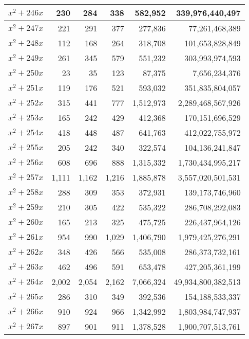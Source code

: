 \documentclass[a4paper]{amsproc}
\theoremstyle{plain}
\begin{document}
\begin{longtable}{ | l | r | r | r | r | r | }
$x^2 + 246x$ & 230 & 284 & 338 & 582{,}952 & 339{,}976{,}440{,}497 \\ \hline
$x^2 + 247x$ & 221 & 291 & 377 & 277{,}836 & 77{,}261{,}468{,}389 \\ \hline
$x^2 + 248x$ & 112 & 168 & 264 & 318{,}708 & 101{,}653{,}828{,}849 \\ \hline
$x^2 + 249x$ & 261 & 345 & 579 & 551{,}232 & 303{,}993{,}974{,}593 \\ \hline
$x^2 + 250x$ & 23 & 35 & 123 & 87{,}375 & 7{,}656{,}234{,}376 \\ \hline
$x^2 + 251x$ & 119 & 176 & 521 & 593{,}032 & 351{,}835{,}804{,}057 \\ \hline
$x^2 + 252x$ & 315 & 441 & 777 & 1{,}512{,}973 & 2{,}289{,}468{,}567{,}926 \\ \hline
$x^2 + 253x$ & 165 & 242 & 429 & 412{,}368 & 170{,}151{,}696{,}529 \\ \hline
$x^2 + 254x$ & 418 & 448 & 487 & 641{,}763 & 412{,}022{,}755{,}972 \\ \hline
$x^2 + 255x$ & 205 & 242 & 340 & 322{,}574 & 104{,}136{,}241{,}847 \\ \hline
$x^2 + 256x$ & 608 & 696 & 888 & 1{,}315{,}332 & 1{,}730{,}434{,}995{,}217 \\ \hline
$x^2 + 257x$ & 1{,}111 & 1{,}162 & 1{,}216 & 1{,}885{,}878 & 3{,}557{,}020{,}501{,}531 \\ \hline
$x^2 + 258x$ & 288 & 309 & 353 & 372{,}931 & 139{,}173{,}746{,}960 \\ \hline
$x^2 + 259x$ & 210 & 305 & 422 & 535{,}322 & 286{,}708{,}292{,}083 \\ \hline
$x^2 + 260x$ & 165 & 213 & 325 & 475{,}725 & 226{,}437{,}964{,}126 \\ \hline
$x^2 + 261x$ & 954 & 990 & 1{,}029 & 1{,}406{,}790 & 1{,}979{,}425{,}276{,}291 \\ \hline
$x^2 + 262x$ & 348 & 426 & 566 & 535{,}008 & 286{,}373{,}732{,}161 \\ \hline
$x^2 + 263x$ & 462 & 496 & 591 & 653{,}478 & 427{,}205{,}361{,}199 \\ \hline
$x^2 + 264x$ & 2{,}002 & 2{,}054 & 2{,}162 & 7{,}066{,}324 & 49{,}934{,}800{,}382{,}513 \\ \hline
$x^2 + 265x$ & 286 & 310 & 349 & 392{,}536 & 154{,}188{,}533{,}337 \\ \hline
$x^2 + 266x$ & 910 & 924 & 966 & 1{,}342{,}992 & 1{,}803{,}984{,}747{,}937 \\ \hline
$x^2 + 267x$ & 897 & 901 & 911 & 1{,}378{,}528 & 1{,}900{,}707{,}513{,}761 \\ \hline

\end{longtable}
\end{document}
